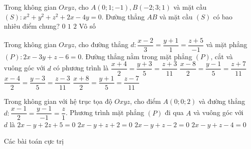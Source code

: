 	\begin{ex}%
	Trong không gian $Oxyz$, cho $A(0;1;-1), B(-2;3;1)$ và mặt cầu $(S)\colon x^2+y^2+z^2+2x-4y=0$. Đường thẳng $AB$ và mặt cầu $(S)$ có bao nhiêu điểm chung?
	\choice
	{$0$}
	{$1$}
	{\True $2$}
	{Vô số}
	\end{ex}
	\begin{ex}%
	Trong không gian $Oxyz$, cho đường thẳng $d\colon\dfrac{x-2}{3}=\dfrac{y+1}{1}=\dfrac{z+5}{-1}$ và mặt phẳng $(P)\colon2x-3y+z-6=0$. Đường thẳng nằm trong mặt phẳng $(P)$, cắt và vuông góc với $d$ có phương trình là
	\choice
	{$\dfrac{x+4}{2}=\dfrac{y+3}{5}=\dfrac{z+3}{11}$}
	{\True $\dfrac{x-8}{2}=\dfrac{y-1}{5}=\dfrac{z+7}{11}$}
	{$\dfrac{x-4}{2}=\dfrac{y-3}{5}=\dfrac{z-3}{11}$}
	{$\dfrac{x+8}{2}=\dfrac{y+1}{5}=\dfrac{z-7}{11}$}
	\end{ex}
	\begin{ex}%
	Trong không gian với hệ trục tọa độ $Oxyz$, cho điểm $A(0;0;2)$ và đường thẳng $d\colon \dfrac{x-1}{2}=\dfrac{y-1}{-1}=\dfrac{z}{1}$. Phương trình mặt phẳng $(P)$ đi qua $A$ và vuông góc với $d$ là
	\choice
	{$2x-y+2z+5=0$}
	{$2x-y+z+2=0$}
	{\True $2x-y+z-2=0$}
	{$2x-y+z-4=0$}
	\end{ex}
	\begin{dang}{Các bài toán cực trị}
	\end{dang}
\setcounter{subsubsection}{0}
\setcounter{vd}{0}
\setcounter{ex}{0}
